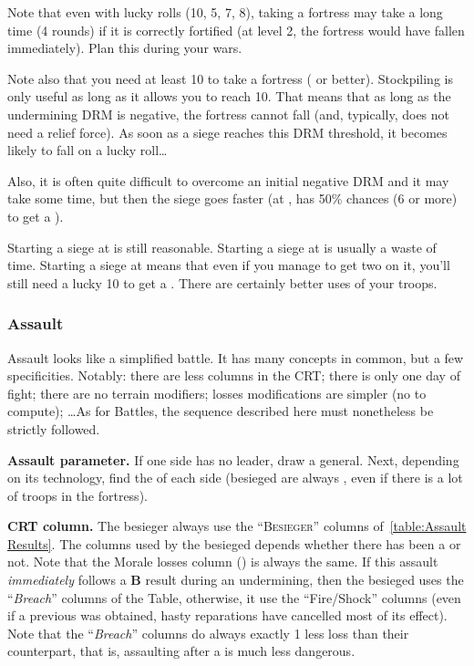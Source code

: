 \begin{playtip}
  Note that even with lucky rolls (10, 5, 7, 8), taking a fortress may take a
  long time (4 rounds) if it is correctly fortified (at level 2, the fortress
  would have fallen immediately). Plan this during your wars.

  Note also that you need at least 10 to take a fortress ( or
  better). Stockpiling \USURE is only useful as long as it allows you to reach
  10. That means that as long as the undermining DRM is negative, the fortress
  cannot fall (and, typically, does not need a relief force). As soon as a
  siege reaches this  DRM threshold, it becomes likely to fall on a
  lucky roll\ldots

  Also, it is often quite difficult to overcome an initial negative DRM and it
  may take some time, but then the siege goes faster (at , \FRA has
  50\% chances (6 or more) to get a ).

  Starting a siege at  is still reasonable. Starting a siege at
   is usually a waste of time. Starting a siege at  means
  that even if you manage to get two \USURE\faceplus on it, you'll still need
  a lucky 10 to get a . There are certainly better uses of your
  troops.
\end{playtip}

\subsubsection{Assault}
Assault looks like a simplified battle. It has many concepts in common, but a
few specificities. Notably: there are less columns in the CRT; there is only
one day of fight; there are no terrain modifiers; losses modifications are
simpler (no  to compute); \ldots As for Battles, the
sequence described here must nonetheless be strictly followed.


\textbf{Assault parameter.} If one side has no leader, draw a
 general. Next, depending on its technology, find the
 of each side (besieged are always , even if
there is a lot of  troops in the fortress).

\textbf{CRT column.} The besieger always use the ``\textsc{Besieger}'' columns
of~\ref{table:Assault Results}. The columns used by the besieged depends
whether there has been a  or not. Note that the Morale losses
column (\textetoile) is always the same. If this assault \emph{immediately}
follows a \textbf{B} result during an undermining, then the besieged uses the
``\emph{Breach}'' columns of the Table, otherwise, it use the ``Fire/Shock''
columns (even if a previous  was obtained, hasty reparations
have cancelled most of its effect). Note that the ``\emph{Breach}'' columns do
always exactly 1 less loss than their counterpart, that is, assaulting after a
 is much less dangerous.

